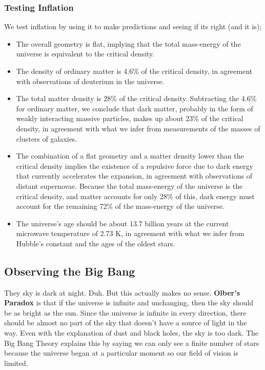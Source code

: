 \subsubsection{Testing Inflation}
We test inflation by using it to make predictions and seeing if its right (and it is);
\begin{itemize}
\item The overall geometry is flat, implying that the total mass-energy of the universe is equivalent to the critical density.
\item The density of ordinary matter is 4.6\% of the critical density, in agreement with observations of deuterium in the universe.
\item The total matter density is 28\% of the critical density. Subtracting the 4.6\% for ordinary matter, we conclude that dark matter, probably in the form of weakly interacting massive particles, makes up about 23\% of the critical density, in agreement with what we infer from measurements of the masses of clusters of galaxies.
\item The combination of a flat geometry and a matter density lower than the critical density implies the existence of a repulsive force due to dark energy that currently accelerates the expansion, in agreement with observations of distant supernovae. Because the total mass-energy of the universe is the critical density, and matter accounts for only 28\% of this, dark energy must account for the remaining 72\% of the mass-energy of the universe.
\item The universe’s age should be about 13.7 billion years at the current microwave temperature of 2.73 K, in agreement with what we infer from Hubble’s constant and the ages of the oldest stars.
\end{itemize}

\subsection{Observing the Big Bang}
They sky is dark at night. Duh. But this actually makes no sense. \textbf{Olber's Paradox} is that if the universe is infinite and unchanging, then the sky should be as bright as the sun. Since the universe is infinite in every direction, there should be almost no part of the sky that doesn't have a source of light in the way. Even with the explanation of dust and black holes, the sky is too dark. The Big Bang Theory explains this by saying we can only see a finite number of stars because the universe began at a particular moment so our field of vision is limited.
